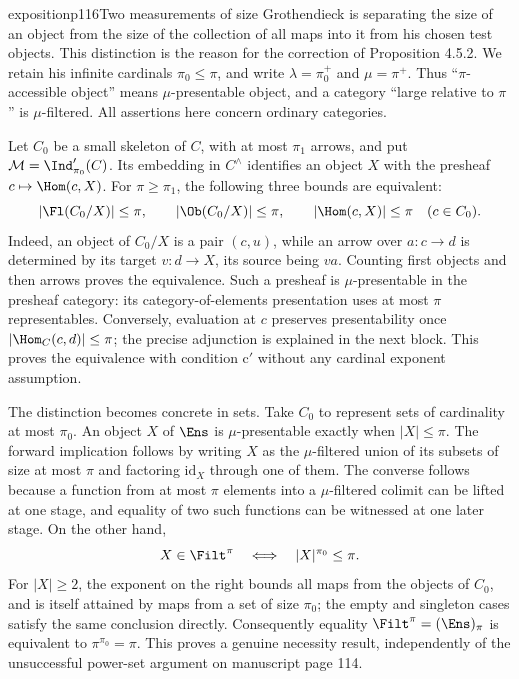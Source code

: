 \begin{dcomment}{exposition}{p116}{Two measurements of size}
Grothendieck is separating the size of an object from the size of the collection of all maps into it from his chosen test objects. This distinction is the reason for the correction of Proposition 4.5.2. We retain his infinite cardinals $\pi_0\leq\pi$, and write $\lambda=\pi_0^+$ and $\mu=\pi^+$. Thus ``$\pi$-accessible object'' means $\mu$-presentable object, and a category ``large relative to $\pi$'' is $\mu$-filtered. All assertions here concern ordinary categories.

Let $C_0$ be a small skeleton of $C$, with at most $\pi_1$ arrows, and put $\mathcal M=\Ind'_{\pi_0}(C)$. Its embedding in $C^\wedge$ identifies an object $X$ with the presheaf $c\mapsto\Hom(c,X)$. For $\pi\geq\pi_1$, the following three bounds are equivalent:
\[
 |\Fl(C_0/X)|\leq\pi,
 \qquad |\Ob(C_0/X)|\leq\pi,
 \qquad |\Hom(c,X)|\leq\pi\quad(c\in C_0).
\]
Indeed, an object of $C_0/X$ is a pair $(c,u)$, while an arrow over $a:c\to d$ is determined by its target $v:d\to X$, its source being $va$. Counting first objects and then arrows proves the equivalence. Such a presheaf is $\mu$-presentable in the presheaf category: its category-of-elements presentation uses at most $\pi$ representables. Conversely, evaluation at $c$ preserves presentability once $|\Hom_C(c,d)|\leq\pi$; the precise adjunction is explained in the next block. This proves the equivalence with condition c$'$ without any cardinal exponent assumption.

The distinction becomes concrete in sets. Take $C_0$ to represent sets of cardinality at most $\pi_0$. An object $X$ of $\Ens$ is $\mu$-presentable exactly when $|X|\leq\pi$. The forward implication follows by writing $X$ as the $\mu$-filtered union of its subsets of size at most $\pi$ and factoring $\mathrm{id}_X$ through one of them. The converse follows because a function from at most $\pi$ elements into a $\mu$-filtered colimit can be lifted at one stage, and equality of two such functions can be witnessed at one later stage. On the other hand,
\[
 X\in\Filt^\pi
 \quad\Longleftrightarrow\quad |X|^{\pi_0}\leq\pi.
\]
For $|X|\geq2$, the exponent on the right bounds all maps from the objects of $C_0$, and is itself attained by maps from a set of size $\pi_0$; the empty and singleton cases satisfy the same conclusion directly. Consequently equality $\Filt^\pi=(\Ens)_\pi$ is equivalent to $\pi^{\pi_0}=\pi$. This proves a genuine necessity result, independently of the unsuccessful power-set argument on manuscript page 114.


\end{dcomment}
